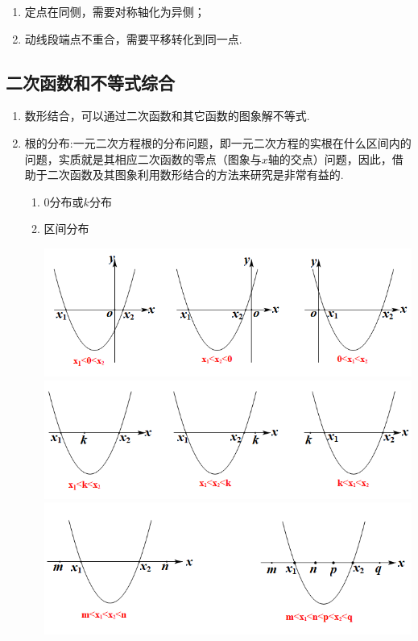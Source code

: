 \documentclass[10pt]{ctexart}
\begin{document}
\begin{enumerate}
\item 定点在同侧，需要对称轴化为异侧；
\item 动线段端点不重合，需要平移转化到同一点.
\end{enumerate}
\subsection{二次函数和不等式综合}
\begin{enumerate}
\item 数形结合，可以通过二次函数和其它函数的图象解不等式.
\item 根的分布:一元二次方程根的分布问题，即一元二次方程的实根在什么区间内的问题，实质就是其相应二次函数的零点（图象与$x$轴的交点）问题，因此，借助于二次函数及其图象利用数形结合的方法来研究是非常有益的.
\begin{enumerate}[(1)]
\item $0$分布或$k$分布
\item 区间分布

\centering
\includegraphics[scale=0.5]{figure/10-1.PNG} \\
\centering
\includegraphics[scale=0.5]{figure/10-2.PNG} \\
\centering
\includegraphics[scale=0.5]{figure/10-3.PNG} 

\end{enumerate}
\end{enumerate}
\end{document}
